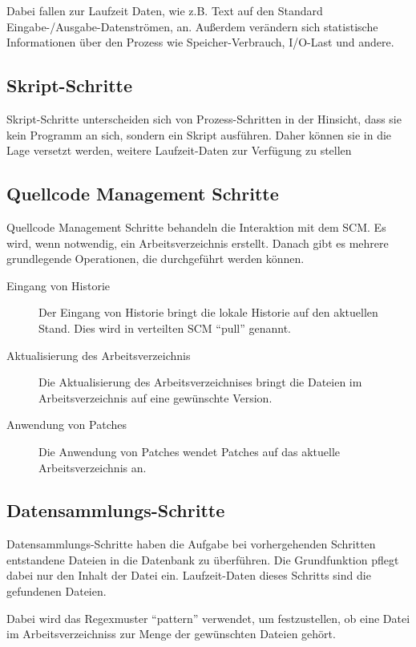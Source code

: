 Dabei fallen zur Laufzeit Daten, wie z.B. Text auf den Standard Eingabe-/Ausgabe-Datenströmen, an.
Außerdem verändern sich statistische Informationen über den Prozess wie Speicher-Verbrauch, I/O-Last und andere.


\subsection{Skript-Schritte}

Skript-Schritte unterscheiden sich von Prozess-Schritten in der Hinsicht,
dass sie kein Programm an sich, sondern ein Skript ausführen.
Daher können sie in die Lage versetzt werden,
weitere Laufzeit-Daten zur Verfügung zu stellen


\subsection{Quellcode Management Schritte}

Quellcode Management Schritte behandeln die Interaktion mit dem SCM.
Es wird, wenn notwendig, ein Arbeitsverzeichnis erstellt.
Danach gibt es mehrere grundlegende Operationen, die durchgeführt werden können.

\begin{description}
    \item[Eingang von Historie]
        Der Eingang von Historie bringt die lokale Historie auf den aktuellen Stand. Dies wird in verteilten \ac{SCM} ``pull'' genannt.
    \item[Aktualisierung des Arbeitsverzeichnis]
        Die Aktualisierung des Arbeitsverzeichnises bringt die Dateien im Arbeitsverzeichnis auf eine gewünschte Version.
    \item[Anwendung von Patches]
        Die Anwendung von Patches wendet Patches auf das aktuelle Arbeitsverzeichnis an.
\end{description}


\subsection{Datensammlungs-Schritte}

Datensammlungs-Schritte haben die Aufgabe
bei vorhergehenden Schritten entstandene Dateien 
in die Datenbank zu überführen.
Die Grundfunktion pflegt dabei nur den Inhalt der Datei ein.
Laufzeit-Daten dieses Schritts sind die gefundenen Dateien.

Dabei wird das Regexmuster ``pattern'' verwendet, um festzustellen,
ob eine Datei im Arbeitsverzeichniss zur Menge der gewünschten Dateien gehört.

